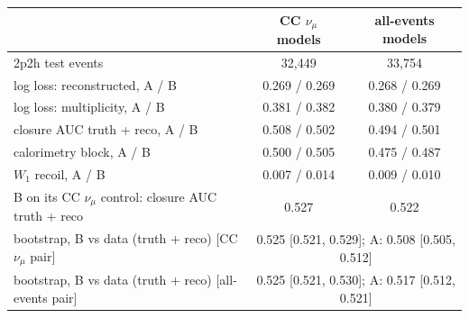 \begin{tabular}{lcc}
\toprule
 & CC $\nu_\mu$ models & all-events models \\
\midrule
2p2h test events & 32,449 & 33,754 \\
log loss: reconstructed, A / B & 0.269 / 0.269 & 0.268 / 0.269 \\
log loss: multiplicity, A / B & 0.381 / 0.382 & 0.380 / 0.379 \\
closure AUC truth + reco, A / B & 0.508 / 0.502 & 0.494 / 0.501 \\
\quad calorimetry block, A / B & 0.500 / 0.505 & 0.475 / 0.487 \\
$W_1$ recoil, A / B & 0.007 / 0.014 & 0.009 / 0.010 \\
B on its CC $\nu_\mu$ control: closure AUC truth + reco & 0.527 & 0.522 \\
bootstrap, B vs data (truth + reco) [CC $\nu_\mu$ pair] & \multicolumn{2}{c}{0.525 [0.521, 0.529]; A: 0.508 [0.505, 0.512]} \\
bootstrap, B vs data (truth + reco) [all-events pair] & \multicolumn{2}{c}{0.525 [0.521, 0.530]; A: 0.517 [0.512, 0.521]} \\
\bottomrule
\end{tabular}

